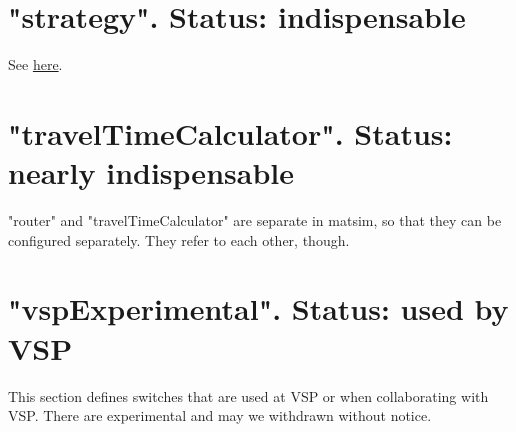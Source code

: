 \section{"strategy". Status: indispensable}


See \href{http://matsim.org/node/478}{here}.

\umbruch
\section{"travelTimeCalculator". Status: nearly indispensable}


"router" and "travelTimeCalculator" are separate in matsim, so that  they can be configured separately. They refer to each other,  though.

\umbruch
\section{"vspExperimental". Status: used by VSP}


This  section defines switches that are used at VSP or when collaborating  with VSP. There are experimental and may we withdrawn without notice.





